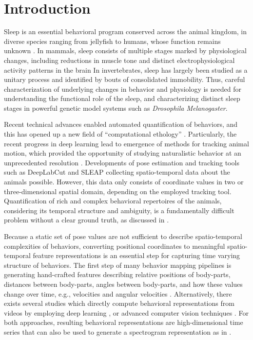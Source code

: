 \setlength{\parindent}{0pt}
\chapter{Introduction}\label{chapter:introduction}
Sleep is an essential behavioral program conserved across the animal kingdom, in diverse species ranging from jellyfish to humans, whose function remains unknown \citep{campbell_animal_1984, nath_jellyfish_2017}.
In mammals, sleep consists of multiple stages marked by physiological changes, including reductions in muscle tone and distinct electrophysiological activity patterns in the brain \citep{corner_sleep_1977, sauer_dynamics_2003} In invertebrates, sleep has largely been studied as a unitary process and identified by bouts of consolidated immobility.
Thus, careful characterization of underlying changes in behavior and physiology is needed for understanding the functional role of the sleep, and characterizing distinct sleep stages in powerful genetic model systems such as \textit{Drosophila Melanogaster}.

Recent technical advances enabled automated quantification of behaviors, and this has opened up a new field of ``computational ethology'' \citep{anderson_toward_2014, datta_computational_2019}.
Particularly, the recent progress in deep learning lead to emergence of  methods for tracking animal motion, which provided the opportunity of studying naturalistic behavior at an unprecedented resolution \citep{pereira_quantifying_2020}.
Developments of pose estimation and tracking tools such as DeepLabCut \citep{mathis_deeplabcut_2018} and SLEAP \citep{pereira_fast_2019, pereira_sleap_2022} collecting spatio-temporal data about the animals possible.
However, this data only consists of coordinate values in two or three-dimensional spatial domain, depending on the employed tracking tool.
Quantification of rich and complex behavioral repertoires of the animals, considering its temporal structure and ambiguity, is a fundamentally difficult problem without a clear ground truth, as discussed in \citet{pereira_quantifying_2020}.

Because a static set of pose values are not sufficient to describe spatio-temporal complexities of behaviors, converting positional coordinates to meaningful spatio-temporal feature representations is an essential step for capturing time varying structure of behaviors.
The first step of many behavior mapping pipelines is generating hand-crafted features describing relative positions of body-parts, distances between body-parts, angles between body-parts, and how these values change over time, e.g., velocities and angular velocities \citep{kabra_jaaba_2013, hsu_b-soid_2021, marshall_continuous_2021, nilsson_simple_2020}.
Alternatively, there exists several studies which directly compute behavioral representations from videos by employing deep learning \citep{bohnslav_deepethogram_2021}, or advanced computer vision techniques \citep{berman_mapping_2014, wiltschko_mapping_2015}.
For both approaches, resulting behavioral representations are high-dimensional time series that  can  also be used to generate a spectrogram representation as in \citet{berman_mapping_2014, todd_systematic_2017, marshall_continuous_2021}.

